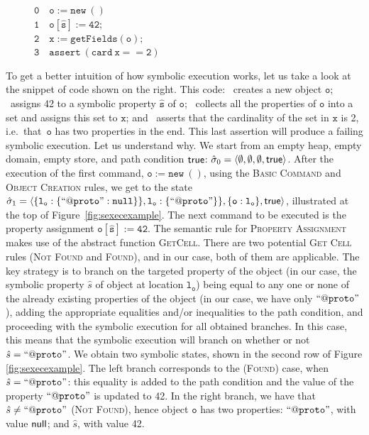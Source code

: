 \vspace{5pt}
\begin{figure}
\vspace*{-0.25cm}
{\small
\hspace*{0.25cm} $\mathtt{0\quad o := new\ ()}$ \\
\hspace*{0.25cm} $\mathtt{1\quad o[\hat{s}] := 42};$ \\
\hspace*{0.25cm} $\mathtt{2\quad x := getFields(o);}$ \\
\hspace*{0.25cm} $\mathtt{3\quad assert\ (card \ x == 2)}$
}
\vspace*{-0.3cm}
\end{figure}
To get a better intuition of how symbolic execution works, let us take a look at the snippet of code shown on the right. 
This code: 
	~creates a new object $\mathtt{o}$;
	~assigns 42 to a symbolic property $\mathtt{\hat{s}}$ of $\mathtt{o}$; 
	~collects all the properties of $\mathtt{o}$ into a set and assigns this set to $\mathtt{x}$; and
	~asserts that the cardinality of the set in $\mathtt{x}$ is 2, i.e.~that~$\mathtt{o}$ has two properties in the end. 
	     This last assertion will produce a failing symbolic execution. Let us understand why.
%
We start from an empty heap, empty domain, empty store, and path condition ${\sf true}$: 
$\hat{\sigma}_0 = \langle \emptyset, \emptyset, \emptyset, {\sf true} \rangle$. After the execution of the first command, $\mathtt{o := new\ ()}$, using the \textsc{Basic Command} and \textsc{Object Creation} rules, we get to the state {\small $\hat{\sigma}_1 = \langle \{ \mathtt{l_o : \{ ``@proto" : null} \} \}, \mathtt{l_o : \{ ``@proto"} \} \}, \{ \mathtt{o : l_o} \} , {\sf true} \rangle$}, illustrated at the top of Figure~\ref{fig:sexecexample}.
The next command to be executed is the property assignment $\mathtt{o[\hat{s}] := 42}$. The semantic rule for \textsc{Property Assignment} makes use 
of the abstract function \textsc{GetCell}. There are two potential \textsc{Get Cell} rules (\textsc{Not Found} and \textsc{Found}), and in our case, both of them are applicable. The key strategy is to branch on the targeted property of the object (in our case, the symbolic property $\hat{s}$ of object at location $\mathtt{l_o}$) being equal to any one or none of the already existing properties of the object (in our case, we have only $\mathtt{``@proto"}$), adding the appropriate equalities and/or inequalities to the path condition, and proceeding with the symbolic execution for all obtained branches. In this case, this means that the symbolic execution will branch on whether or not $\hat{s} = \mathtt{``@proto"}$. We obtain two symbolic states, shown in the second row of Figure \ref{fig:sexecexample}. The left branch corresponds to the (\textsc{Found}) case, when $\hat{s} = \mathtt{``@proto"}$: this equality is added to the path condition and the value of the property $\mathtt{``@proto"}$ is updated to 42. In the right branch, we have that $\hat{s} \neq \mathtt{``@proto"}$ (\textsc{Not Found}), hence object $\mathtt{o}$ has two properties: $ \mathtt{``@proto"}$, with value ${\sf null}$; and $\hat{s}$, with value 42.
